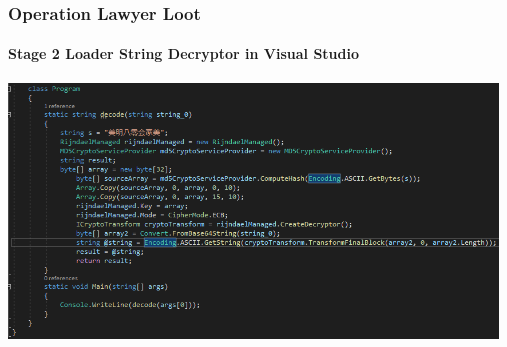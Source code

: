 \documentclass[aspectratio=169]{beamer}
\begin{document}
{
\begin{frame}
  \frametitle{Operation Lawyer Loot}
  \framesubtitle{Stage 2 Loader String Decryptor in Visual Studio}
  \begin{center}
    \includegraphics[width=13cm]{kpot-unpacking-6}
  \end{center}
\end{frame}
}
\end{document}
